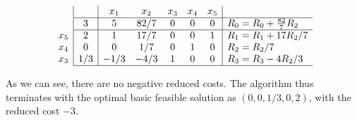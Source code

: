 $$
\begin{array}{c}
\\
\\
x_5\\
x_4 \\
x_3 \\ 
\end{array}
\begin{array}{|c|ccccc|l}
     & x_1 & x_2 & x_3 & x_4 & x_5  \\ \hline
   3 & 5 & 82/7 & 0 & 0 & 0 & R_0 = R_0 + \frac{82}{7}R_2\\ \hline
   2 & 1 & 17/7 & 0  & 0  & 1 & R_1 = R_1 + 17R_2/7\\
   0 & 0 & 1/7 & 0 & 1 & 0  & R_2 = R_2/7\\
   1/3 & -1/3 & -4/3 & 1 & 0 & 0 & R_3 = R_3 - 4R_2/3 \\ \hline
\end{array}
$$

As we can see, there are no negative reduced costs. The algorithm thus terminates with the optimal basic feasible solution as $(0,0,1/3,0,2)$, with the reduced cost $-3$.